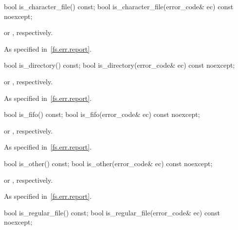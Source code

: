 %
\begin{itemdecl}
bool is_character_file() const;
bool is_character_file(error_code& ec) const noexcept;
\end{itemdecl}

\begin{itemdescr}
\pnum
\returns
{} or , respectively.

\pnum
\throws
As specified in~\ref{fs.err.report}.
\end{itemdescr}

%
\begin{itemdecl}
bool is_directory() const;
bool is_directory(error_code& ec) const noexcept;
\end{itemdecl}

\begin{itemdescr}
\pnum
\returns
{} or , respectively.

\pnum
\throws
As specified in~\ref{fs.err.report}.
\end{itemdescr}

%
\begin{itemdecl}
bool is_fifo() const;
bool is_fifo(error_code& ec) const noexcept;
\end{itemdecl}

\begin{itemdescr}
\pnum
\returns
{} or , respectively.

\pnum
\throws
As specified in~\ref{fs.err.report}.
\end{itemdescr}

%
\begin{itemdecl}
bool is_other() const;
bool is_other(error_code& ec) const noexcept;
\end{itemdecl}

\begin{itemdescr}
\pnum
\returns
{} or , respectively.

\pnum
\throws
As specified in~\ref{fs.err.report}.
\end{itemdescr}

%
\begin{itemdecl}
bool is_regular_file() const;
bool is_regular_file(error_code& ec) const noexcept;
\end{itemdecl}

